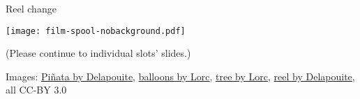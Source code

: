 \documentclass[aspectratio=169]{beamer}
\begin{document}
\begin{frame}{Reel change}
    \begin{block}{\texttt{[image: film-spool-nobackground.pdf]}\mbox{\quad}}
        \mbox{}

        \vspace{-1.7cm}

        (Please continue to individual slots' slides.)
    \end{block}

    \vfill
    \tiny Images:
    \href{https://game-icons.net/1x1/delapouite/pinata.html}{Piñata by Delapouite},
    \href{https://game-icons.net/1x1/lorc/balloons.html}{balloons by Lorc},
    \href{https://game-icons.net/1x1/lorc/pine-tree.html}{tree by Lorc},
    \href{https://game-icons.net/1x1/delapouite/film-spool.html}{reel by Delapouite}, all CC-BY 3.0
\end{frame}
\end{document}
